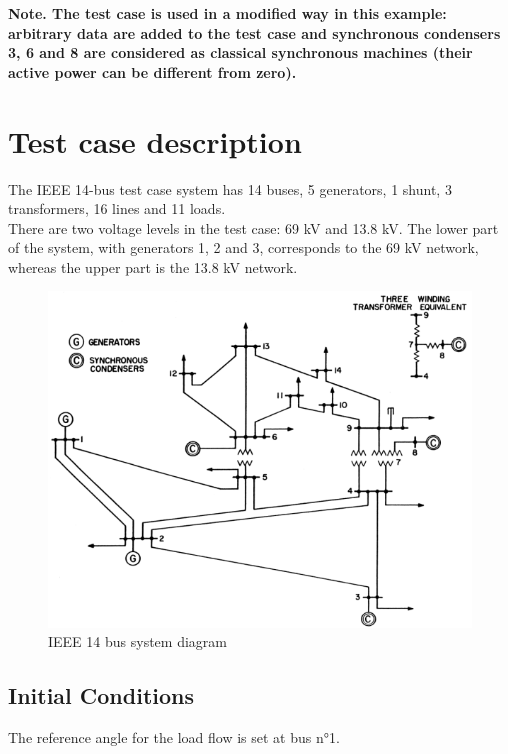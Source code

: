 \documentclass[a4paper, 12pt]{report}
\begin{document}
\textbf{Note. The test case is used in a modified way in this example: arbitrary data are added to the test case and synchronous condensers 3, 6 and 8 are considered as classical synchronous machines (their active power can be different from zero).}

\section{Test case description}

The IEEE 14-bus test case system has 14 buses, 5 generators, 1 shunt, 3 transformers, 16 lines and 11 loads.\\
There are two voltage levels in the test case: 69 kV and 13.8 kV. The lower part of the system, with generators 1, 2 and 3, corresponds to the 69 kV network, whereas the upper part is the 13.8 kV network.

\begin{figure}[H]
  \includegraphics[width=\textwidth]{Single-line-diagram-of-IEEE-14-bus-system.png}
  \caption{IEEE 14 bus system diagram}
\end{figure}

\subsection{Initial Conditions}

The reference angle for the load flow is set at bus n°1. \\
\end{document}
